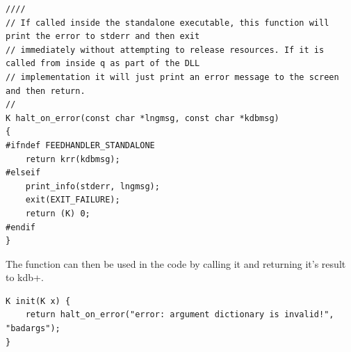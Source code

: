 \begin{lstlisting}
////
// If called inside the standalone executable, this function will print the error to stderr and then exit
// immediately without attempting to release resources. If it is called from inside q as part of the DLL
// implementation it will just print an error message to the screen and then return.
//
K halt_on_error(const char *lngmsg, const char *kdbmsg)
{
#ifndef FEEDHANDLER_STANDALONE
	return krr(kdbmsg);
#elseif
	print_info(stderr, lngmsg);
	exit(EXIT_FAILURE);
	return (K) 0;
#endif
}
\end{lstlisting}

The function can then be used in the code by calling it and returning it's result to kdb+. 

\begin{lstlisting}
K init(K x) {
	return halt_on_error("error: argument dictionary is invalid!", "badargs");
}
\end{lstlisting}
